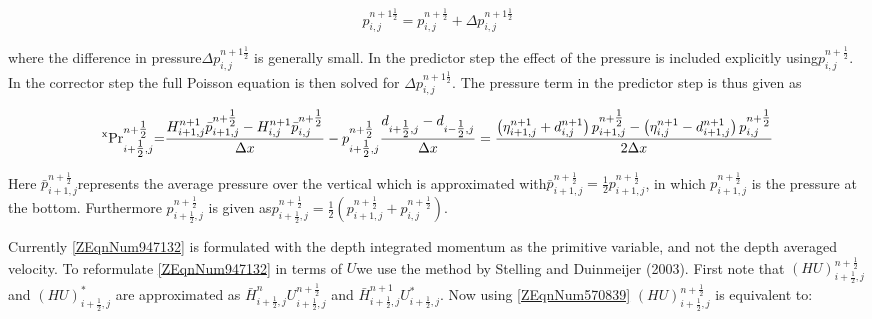 \documentclass{article}
\begin{document}
\noindent 
\begin{equation} \label{ZEqnNum786367} 
p_{i,j}^{n+1{\tfrac{1}{2}} } =p_{i,j}^{n+{\tfrac{1}{2}} } +\Delta p_{i,j}^{n+1{\tfrac{1}{2}} }  
\end{equation} 


\noindent where the difference in pressure$\Delta p_{i,j}^{n+1{\tfrac{1}{2}} } $ is generally small. In the predictor step the effect of the pressure is included explicitly using$p_{i,j}^{n+{\tfrac{1}{2}} } $. In the corrector step the full Poisson equation is then solved for $\Delta p_{i,j}^{n+1{\tfrac{1}{2}} } $. The pressure term in the predictor step is thus given as 

\noindent 
\begin{equation} \label{6.37)} 
{}^{{\rm x}} {\rm Pr}_{i+{\tfrac{1}{2}} ,j}^{n+{\tfrac{1}{2}} } {\rm =}\frac{H_{i+1,j}^{n+1} \bar{p}_{i+1,j}^{n+{\tfrac{1}{2}} } -H_{i,j}^{n+1} \bar{p}_{i,j}^{n+{\tfrac{1}{2}} } }{\Delta x} -p_{i+{\tfrac{1}{2}} ,j}^{n+{\tfrac{1}{2}} } \frac{d_{i+{\tfrac{1}{2}} ,j} -d_{i-{\tfrac{1}{2}} ,j} }{\Delta x} =\frac{\left(\eta _{i+1,j}^{n+1} +d_{i,j}^{n+1} \right)p_{i+1,j}^{n+{\tfrac{1}{2}} } -\left(\eta _{i,j}^{n+1} -d_{i+1,j}^{n+1} \right)p_{i,j}^{n+{\tfrac{1}{2}} } }{2\Delta x}  
\end{equation} 


\noindent Here $\bar{p}_{i+1,j}^{n+{\tfrac{1}{2}} } $represents the average pressure over the vertical which is approximated with$\bar{p}_{i+1,j}^{n+{\tfrac{1}{2}} } ={\tfrac{1}{2}} p_{i+1,j}^{n+{\tfrac{1}{2}} } $, in which $p_{i+1,j}^{n+{\tfrac{1}{2}} } $ is the pressure at the bottom. Furthermore $p_{i+{\tfrac{1}{2}} ,j}^{n+{\tfrac{1}{2}} } $ is given as$p_{i+{\tfrac{1}{2}} ,j}^{n+{\tfrac{1}{2}} } ={\tfrac{1}{2}} \left(p_{i+1,j}^{n+{\tfrac{1}{2}} } +p_{i,j}^{n+{\tfrac{1}{2}} } \right)$.

\noindent 

\noindent Currently \eqref{ZEqnNum947132} is formulated with the depth integrated momentum as the primitive variable, and not the depth averaged velocity. To reformulate \eqref{ZEqnNum947132} in terms of $U$we use the method by Stelling and Duinmeijer (2003). First note that $\left(HU\right)_{i+{\tfrac{1}{2}} ,j}^{n+{\tfrac{1}{2}} } $ and $\left(HU\right)_{i+{\tfrac{1}{2}} ,j}^{*} $ are approximated as $\bar{H}_{i+{\tfrac{1}{2}} ,j}^{n} U_{i+{\tfrac{1}{2}} ,j}^{n+{\tfrac{1}{2}} } $ and $\bar{H}_{i+{\tfrac{1}{2}} ,j}^{n+1} U_{i+{\tfrac{1}{2}} ,j}^{*} $. Now using \eqref{ZEqnNum570839} $\left(HU\right)_{i+{\tfrac{1}{2}} ,j}^{n+{\tfrac{1}{2}} } $ is equivalent to:
\end{document}
